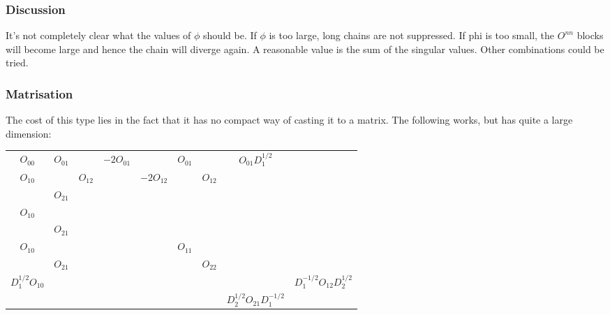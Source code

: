 \subsubsection*{Discussion}
It's not completely clear what the values of $\phi$ should be.  If $\phi$ is too large, long chains are not suppressed. If phi is too small, the $O^{n n}$ blocks will become large and hence the chain will diverge again. A reasonable value is the sum of the singular values. Other combinations could be tried.

\subsubsection*{Matrisation}
The cost of this type lies in the fact that it has no compact way of casting it to a matrix. The following works, but has quite a large dimension:

\begin{tabular}{ccc|cc|cc|cc}
  $O_{00}$               & $O_{01} $   &             & $-2  O_{01}$ &                & $ O_{01}$ &             & $ O_{01}  D_1^{1/2}$           &                                \\
  ${O_{10}}$             &             & ${ O_{12}}$ &              & $-2 { O_{12}}$ &           & ${ O_{12}}$ &                                &                                \\
                         & ${ O_{21}}$ &             &              &                &           &             &                                &                                \\
  \hline
  ${O_{10}}$             &             &             &              &                &           &             &                                &                                \\
                         & ${ O_{21}}$ &             &              &                &           &             &                                &                                \\
  \hline
  ${ O_{10}}$            &             &             &              &                & $O_{11}$  &             &                                &                                \\
                         & ${ O_{21}}$ &             &              &                &           & $O_{22}$    &                                &                                \\
  \hline
  $ D_1^{1/2} { O_{10}}$ &             &             &              &                &           &             &                                & $D_1^{-1/2} O_{12}  D_2^{1/2}$ \\
                         &             &             &              &                &           &             & $ D_2^{1/2} O_{21} D_1^{-1/2}$                                  \\\end{tabular}

